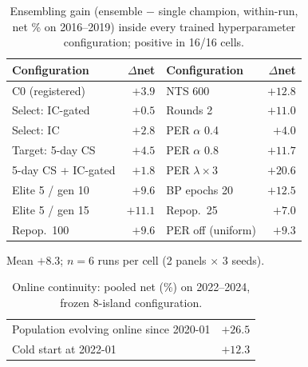 \begin{table}[t]
\centering
\small
\begin{tabular}{@{}lr@{\quad}lr@{}}
\toprule
Configuration & $\Delta$net & Configuration & $\Delta$net \\
\midrule
C0 (registered)      & $+3.9$  & NTS 600            & $+12.8$ \\
Select: IC-gated     & $+0.5$  & Rounds 2           & $+11.0$ \\
Select: IC           & $+2.8$  & PER $\alpha$ 0.4   & $+4.0$  \\
Target: 5-day CS     & $+4.5$  & PER $\alpha$ 0.8   & $+11.7$ \\
5-day CS + IC-gated  & $+1.8$  & PER $\lambda{\times}3$ & $+20.6$ \\
Elite 5 / gen 10     & $+9.6$  & BP epochs 20       & $+12.5$ \\
Elite 5 / gen 15     & $+11.1$ & Repop.\ 25         & $+7.0$  \\
Repop.\ 100          & $+9.6$  & PER off (uniform)  & $+9.3$  \\
\bottomrule
\end{tabular}
\par\smallskip
{\footnotesize Mean $+8.3$; $n{=}6$ runs per cell (2 panels $\times$ 3
seeds).\par}
\caption{Ensembling gain (ensemble $-$ single champion, within-run, net \%
on 2016--2019) inside every trained hyperparameter configuration; positive
in 16/16 cells.}
\label{tab:invariance}
\end{table}

\begin{table}[t]
\centering
\small
\begin{tabular}{@{}lr@{}}
\toprule
Population evolving online since 2020-01 & $+26.5$ \\
Cold start at 2022-01                     & $+12.3$ \\
\bottomrule
\end{tabular}
\caption{Online continuity: pooled net (\%) on 2022--2024, frozen 8-island
configuration.}
\label{tab:continuity}
\end{table}

